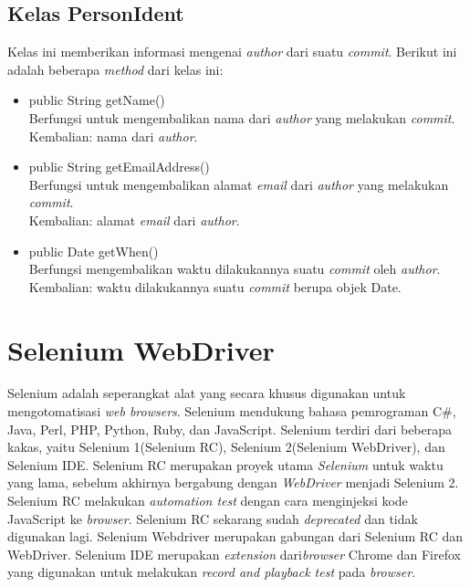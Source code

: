 \subsection{Kelas PersonIdent}
\label{subsec:personident}
Kelas ini memberikan informasi mengenai \textit{author} dari suatu \textit{commit}. Berikut ini adalah beberapa \textit{method} dari kelas ini:
\begin{itemize}
\item public String getName()\\
Berfungsi untuk mengembalikan nama dari \textit{author} yang melakukan \textit{commit}.\\
Kembalian: nama dari \textit{author}.

\item public String getEmailAddress()\\
Berfungsi untuk mengembalikan alamat \textit{email} dari \textit{author} yang melakukan \textit{commit}.\\
Kembalian: alamat \textit{email} dari \textit{author}.

\item public Date getWhen()\\
Berfungsi mengembalikan waktu dilakukannya suatu \textit{commit} oleh \textit{author}.\\
Kembalian: waktu dilakukannya suatu \textit{commit} berupa objek Date.
\end{itemize}

\section{Selenium WebDriver}
\label{sec:selenium_webdriver}
Selenium adalah seperangkat alat yang secara khusus digunakan untuk mengotomatisasi \textit{web browsers}\cite{Selenium}. Selenium mendukung bahasa pemrograman C\#, Java, Perl, PHP, Python, Ruby, dan JavaScript. Selenium terdiri dari beberapa kakas, yaitu Selenium 1(Selenium RC), Selenium 2(Selenium WebDriver), dan Selenium IDE. Selenium RC merupakan proyek utama \textit{Selenium} untuk waktu yang lama, sebelum akhirnya bergabung dengan \textit{WebDriver} menjadi Selenium 2. Selenium RC melakukan \textit{automation test} dengan cara menginjeksi kode JavaScript ke \textit{browser}. Selenium RC sekarang sudah \textit{deprecated} dan tidak digunakan lagi. Selenium Webdriver merupakan gabungan dari Selenium RC dan WebDriver. Selenium IDE merupakan \textit{extension} dari\textit{browser} Chrome dan Firefox yang digunakan untuk melakukan \textit{record and playback test} pada \textit{browser}. 
 
